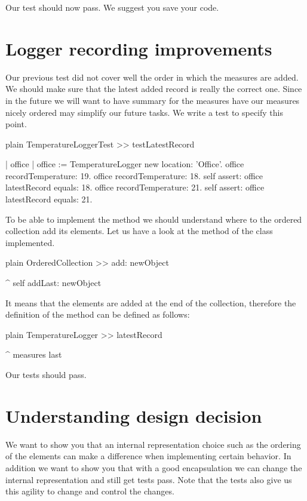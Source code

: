 \documentclass[10pt,twoside,english]{_support/latex/sbabook/sbabook}
\begin{document}
Our test should now pass. We suggest you save your code.
\section{Logger recording improvements}
Our previous test did not cover well the order in which the measures are added.  We should make sure that the latest added record is really the correct one. Since in the future we will want to have summary for the measures have our measures nicely ordered may simplify our future tasks. We write a test to specify this point.

\begin{displaycode}{plain}
TemperatureLoggerTest >> testLatestRecord

    | office |
    office := TemperatureLogger new location: 'Office'.
    office recordTemperature: 19.
    office recordTemperature: 18.
    self assert: office latestRecord equals: 18.
    office recordTemperature: 21.
    self assert: office latestRecord equals: 21.
\end{displaycode}

To be able to implement the method  we should understand where to the ordered collection
add its elements. Let us have a look at the  method of the class  implemented.

\begin{displaycode}{plain}
OrderedCollection >> add: newObject

    ^ self addLast: newObject
\end{displaycode}

It means that the elements are added at the end of the collection, therefore the definition of the method  can be defined as follows:

\begin{displaycode}{plain}
TemperatureLogger >> latestRecord

    ^ measures last
\end{displaycode}

Our tests should pass.
\section{Understanding design decision}
We want to show you that an internal representation choice such as the ordering of the elements can make a difference
when implementing certain behavior. In addition we want to show you that with a good encapsulation we can change the internal representation and still get tests pass. Note that the tests also give us this agility to change and control the changes.
\end{document}
